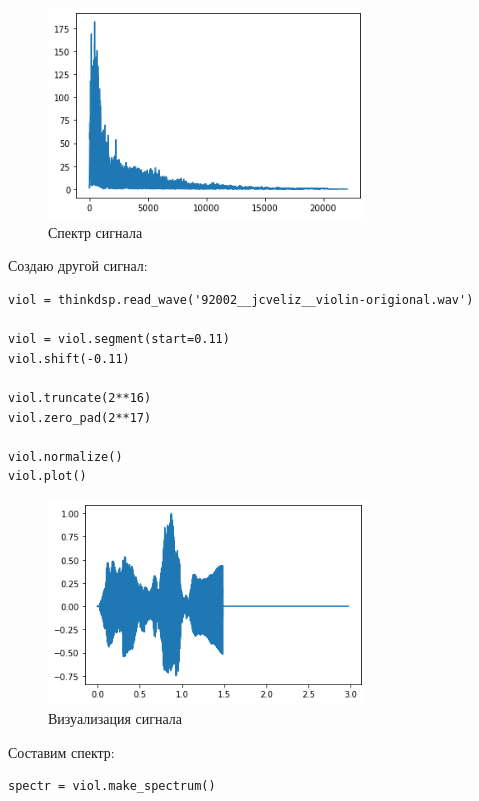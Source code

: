 \documentclass[a4paper,12pt]{report}
\begin{document}
\begin{figure}[H]
        \centering
        \includegraphics[width=0.75\textwidth]{2.png}
        \caption{Спектр сигнала}
        \label{2}
\end{figure}

Создаю другой сигнал:

\begin{lstlisting}[caption=Усечение сигнала]
viol = thinkdsp.read_wave('92002__jcveliz__violin-origional.wav')

viol = viol.segment(start=0.11)
viol.shift(-0.11)

viol.truncate(2**16)
viol.zero_pad(2**17)

viol.normalize()
viol.plot()
\end{lstlisting}

\begin{figure}[H]
        \centering
        \includegraphics[width=0.75\textwidth]{3.png}
        \caption{Визуализация сигнала}
        \label{3}
\end{figure}

Составим спектр:

\begin{lstlisting}[caption=Спектр сигнала]
spectr = viol.make_spectrum()
\end{lstlisting}
\end{document}
